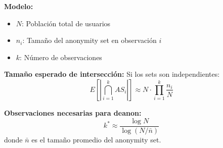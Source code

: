 \documentclass[11pt,a4paper,twoside]{book}
\theoremstyle{definition}
\theoremstyle{remark}
\begin{document}
\begin{mathnote}
\textbf{Modelo:}
\begin{itemize}
    \item $N$: Población total de usuarios
    \item $n_i$: Tamaño del anonymity set en observación $i$
    \item $k$: Número de observaciones
\end{itemize}

\textbf{Tamaño esperado de intersección:}
Si los sets son independientes:
\[
E[|\bigcap_{i=1}^{k} AS_i|] \approx N \cdot \prod_{i=1}^{k} \frac{n_i}{N}
\]

\textbf{Observaciones necesarias para deanon:}
\[
k^* \approx \frac{\log N}{\log(N/\bar{n})}
\]
donde $\bar{n}$ es el tamaño promedio del anonymity set.
\end{mathnote}
\end{document}
